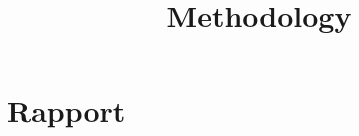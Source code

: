 \documentclass[12pt,a4paper]{article}      %
\title{Methodology}  %
\begin{document}

\section{Rapport}
\end{document}
